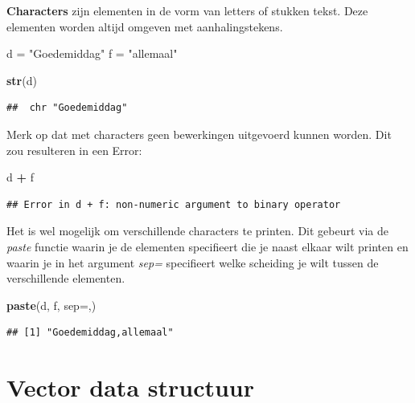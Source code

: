 \documentclass[
]{book}
\newenvironment{Shaded}{\begin{snugshade}}{\end{snugshade}}
\newcommand{\AttributeTok}[1]{\textcolor[rgb]{0.13,0.29,0.53}{#1}}
\newcommand{\FunctionTok}[1]{\textcolor[rgb]{0.13,0.29,0.53}{\textbf{#1}}}
\newcommand{\NormalTok}[1]{#1}
\newcommand{\OtherTok}[1]{\textcolor[rgb]{0.56,0.35,0.01}{#1}}
\newcommand{\SpecialCharTok}[1]{\textcolor[rgb]{0.81,0.36,0.00}{\textbf{#1}}}
\newcommand{\StringTok}[1]{\textcolor[rgb]{0.31,0.60,0.02}{#1}}
\begin{document}
\textbf{Characters} zijn elementen in de vorm van letters of stukken tekst. Deze elementen
worden altijd omgeven met aanhalingstekens.

\begin{Shaded}
\begin{Highlighting}[]
\NormalTok{d }\OtherTok{=} \StringTok{"Goedemiddag"}
\NormalTok{f }\OtherTok{=} \StringTok{"allemaal"}

\FunctionTok{str}\NormalTok{(d)}
\end{Highlighting}
\end{Shaded}

\begin{verbatim}
##  chr "Goedemiddag"
\end{verbatim}

Merk op dat met characters geen bewerkingen uitgevoerd kunnen worden.
Dit zou resulteren in een Error:

\begin{Shaded}
\begin{Highlighting}[]
\NormalTok{d }\SpecialCharTok{+}\NormalTok{ f}
\end{Highlighting}
\end{Shaded}

\begin{verbatim}
## Error in d + f: non-numeric argument to binary operator
\end{verbatim}

Het is wel mogelijk om verschillende characters te printen. Dit gebeurt
via de \emph{paste} functie waarin je de elementen specifieert die je naast
elkaar wilt printen en waarin je in het argument \emph{sep=} specifieert welke scheiding je
wilt tussen de verschillende elementen.

\begin{Shaded}
\begin{Highlighting}[]
\FunctionTok{paste}\NormalTok{(d, f, }\AttributeTok{sep=}\StringTok{\textquotesingle{},\textquotesingle{}}\NormalTok{)}
\end{Highlighting}
\end{Shaded}

\begin{verbatim}
## [1] "Goedemiddag,allemaal"
\end{verbatim}

\hypertarget{vector-data-structuur}{%
\section{Vector data structuur}\label{vector-data-structuur}}
\end{document}
